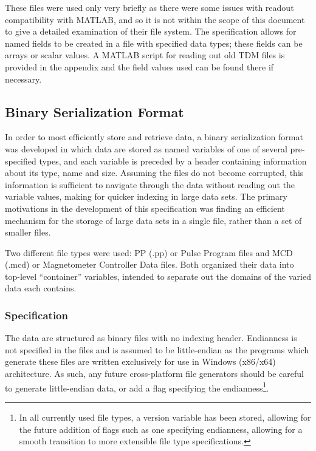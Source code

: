 \documentclass[PaulGanssle-Thesis.tex]{subfiles}
\begin{document}
These files were used only very briefly as there were some issues with readout compatibility with MATLAB, and so it is not within the scope of this document to give a detailed examination of their file system. The specification allows for named fields to be created in a file with specified data types; these fields can be arrays or scalar values. A MATLAB script for reading out old TDM files is provided in the appendix and the field values used can be found there if necessary.

\subsection{Binary Serialization Format}
\label{console.software.bin}
In order to most efficiently store and retrieve data, a binary serialization format was developed in which data are stored as named variables of one of several pre-specified types, and each variable is preceded by a header containing information about its type, name and size. Assuming the files do not become corrupted, this information is sufficient to navigate through the data without reading out the variable values, making for quicker indexing in large data sets. The primary motivations in the development of this specification was finding an efficient mechanism for the storage of large data sets in a single file, rather than a set of smaller files.

Two different file types were used: PP (.pp) or Pulse Program files and MCD (.mcd) or Magnetometer Controller Data files. Both organized their data into top-level ``container'' variables, intended to separate out the domains of the varied data each contains.

\subsubsection{Specification}
\label{console.software.bin.spec}
The data are structured as binary files with no indexing header. Endianness is not specified in the files and is assumed to be little-endian as the programs which generate these files are written exclusively for use in Windows (x86/x64) architecture. As such, any future cross-platform file generators should be careful to generate little-endian data, or add a flag specifying the endianness\footnote{In all currently used file types, a version variable has been stored, allowing for the future addition of flags such as one specifying endianness, allowing for a smooth transition to more extensible file type specifications.}.
\end{document}
